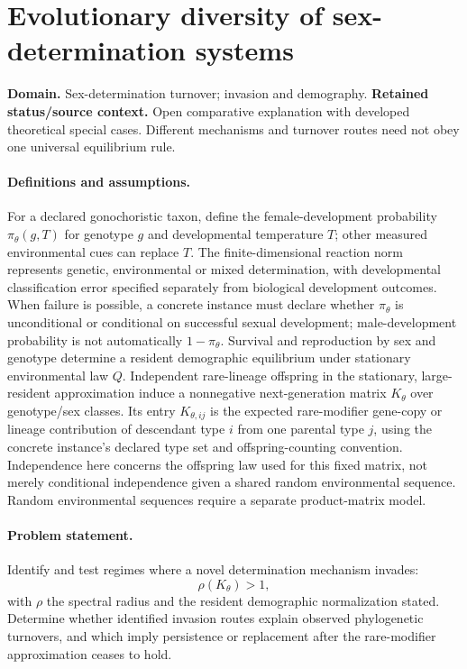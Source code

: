 \documentclass[11pt]{article}
\begin{document}
\section*{Evolutionary diversity of sex-determination systems}
\label{prob:324}
\label{rank:205}
\par\smallskip

\noindent\textbf{Domain.} Sex-determination turnover; invasion and demography. \quad \textbf{Retained status/source context.} Open comparative explanation with developed theoretical special cases. Different mechanisms and turnover routes need not obey one universal equilibrium rule.

\paragraph{Definitions and assumptions.} For a declared gonochoristic taxon, define the female-development probability $\pi_\theta(g,T)$ for genotype $g$ and developmental temperature $T$; other measured environmental cues can replace $T$. The finite-dimensional reaction norm represents genetic, environmental or mixed determination, with developmental classification error specified separately from biological development outcomes. When failure is possible, a concrete instance must declare whether $\pi_\theta$ is unconditional or conditional on successful sexual development; male-development probability is not automatically $1-\pi_\theta$. Survival and reproduction by sex and genotype determine a resident demographic equilibrium under stationary environmental law $Q$. Independent rare-lineage offspring in the stationary, large-resident approximation induce a nonnegative next-generation matrix $K_\theta$ over genotype/sex classes. Its entry $K_{\theta,ij}$ is the expected rare-modifier gene-copy or lineage contribution of descendant type $i$ from one parental type $j$, using the concrete instance's declared type set and offspring-counting convention. Independence here concerns the offspring law used for this fixed matrix, not merely conditional independence given a shared random environmental sequence. Random environmental sequences require a separate product-matrix model.

\paragraph{Problem statement.} Identify and test regimes where a novel determination mechanism invades:
    \[\rho(K_\theta)>1,\]
    with $\rho$ the spectral radius and the resident demographic normalization stated. Determine whether identified invasion routes explain observed phylogenetic turnovers, and which imply persistence or replacement after the rare-modifier approximation ceases to hold.
\end{document}
